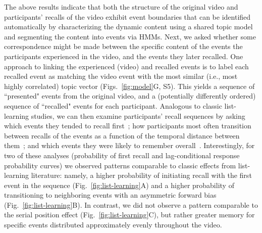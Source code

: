 \documentclass{article}
\newcommand{\matchmats}{S5}
\begin{document}
The above results indicate that both the structure of the original video and participants' recalls of the video exhibit event boundaries that can be identified automatically by characterizing the dynamic content using a shared topic model and segmenting the content into events via HMMs.  Next, we asked whether some correspondence might be made between the specific content of the events the participants experienced in the video, and the events they later recalled.  One approach to linking the experienced (video) and recalled events is to label each recalled event as matching the video event with the most similar (i.e., most highly correlated) topic vector (Figs.~\ref{fig:model}G, \matchmats).  This yields a sequence of ``presented" events from the original video, and a (potentially differently ordered) sequence of ``recalled" events for each participant.  Analogous to classic list-learning studies, we can then examine participants' recall sequences by asking which events they tended to recall first~\citep[probability of first recall; Fig.~\ref{fig:list-learning}A;][]{AtkiShif68, PostPhil65, WelcBurn24}; how participants most often transition between recalls of the events as a function of the temporal distance between them~\citep[lag-conditional response probability; Fig.~\ref{fig:list-learning}B;][]{Kaha96}; and which events they were likely to remember overall~\citep[serial position recall analyses; Fig.~\ref{fig:list-learning}C;][]{Murd62a}. Interestingly, for two of these analyses (probability of first recall and lag-conditional response probability curves) we observed patterns comparable to classic effects from list-learning literature: namely, a higher probability of initiating recall with the first event in the sequence (Fig.~\ref{fig:list-learning}A) and a higher probability of transitioning to neighboring events with an asymmetric forward bias (Fig.~\ref{fig:list-learning}B). In contrast, we did not observe a pattern comparable to the serial position effect (Fig.~\ref{fig:list-learning}C), but rather greater memory for specific events distributed approximately evenly throughout the video.
\end{document}
